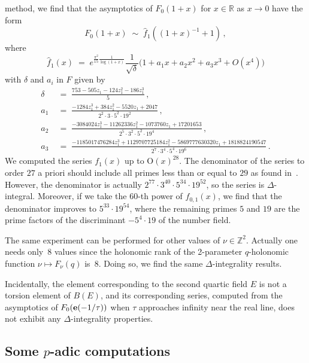 \documentclass[12pt,reqno]{amsart}
\theoremstyle{definition}
\def\BZ{\mathbb Z}
\def\BR{\mathbb R}
\def\be{\begin{equation}}
\def\ee{\end{equation}}
\def\e{\bold e}
\def\={\;=\;}
\def\Phitof{f}
\begin{document}
method, we find that the asymptotics of $F_0(1+x)$ for
$x\in\BR$ as $x\rightarrow 0$ have the form
\be
F_0(1+x) \;\sim\; \widehat{\Phitof}_{1}((1+x)^{-1}+1)\,,
\ee
where
\be
\widehat{\Phitof}_{1}(x) \= 
e^{\frac{\pi^2}{15} \frac{1}{\log(1+x)}}
\frac{1}{\sqrt{\delta}}
\big(1+a_{1}x+a_{2}x^2+a_{3}x^3 + O(x^4)\big)
\ee
with $\delta$ and $a_{i}$ in $F$ given by
\be
\begin{aligned}
\delta&\=\frac{753-505z_1-124z_1^2-186z_1^3}{5}\,,\\
a_{1} &\= \frac{-1284z_1^3 + 384z_1^2 - 5520z_1 + 2047}{2^2\cdot3\cdot5^2\cdot19^2}\,,
\\
a_{2} &\= \frac{-3084024z_1^3 - 11262336z_1^2 - 1073760z_1 + 17201653}{
2^5\cdot3^2\cdot5^2\cdot19^4}\,, \\
a_{3} &\= \frac{-1185017476284z_1^3 + 1129707725184z_1^2 - 5869777630320z_1
+ 1818824190547}{2^7\cdot3^4\cdot5^4\cdot19^6} \,.
\end{aligned}
\ee
We computed the series $\Phitof_{1}(x)$ up to $\mathrm{O}(x)^{28}$. The denominator of
the series to order $27$ a priori should include all primes less
than or equal to $29$ as found in~\cite[Sec.9.2, Thm.9.1]{GZ:kashaev}. However, the 
denominator is actually $2^{77}\cdot 3^{40}\cdot 5^{34}\cdot 19^{52}$, so the series is
$\Delta$-integral. Moreover, if we take the $60$-th power of $\Phitof_{0,1}(x)$, we
find that
the denominator improves to $5^{33}\cdot 19^{54}$, where the remaining primes $5$ and
$19$ are the prime factors of the discriminant $-5^4 \cdot 19$ of the number field.

The same experiment can be performed for other values of $\nu \in \BZ^2$. Actually
one needs only~8 values since the holonomic rank of the 2-parameter $q$-holonomic
function $\nu \mapsto F_\nu(q)$ is~8. Doing so, we find the same $\Delta$-integrality
results.

Incidentally, the element corresponding to the second quartic field $E$ is not
a torsion element of $B(E)$, and its corresponding series,  computed from the
asymptotics of $F_0(\e(-1/\tau))$ when $\tau$ approaches infinity near the real line,
does not exhibit any $\Delta$-integrality properties.

\subsection{\texorpdfstring{Some $p$-adic computations}{Some p-adic computations}}
\label{sub.padic.compute}
\end{document}

